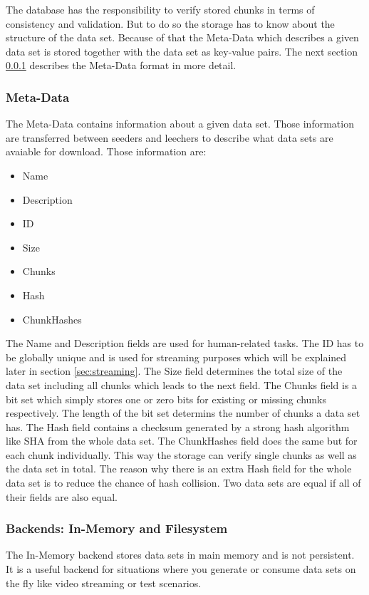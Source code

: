 The database has the responsibility to verify stored chunks in terms of consistency and validation. But to do so the storage has to know about the structure of the data set. Because of that the Meta-Data which describes a given data set is stored together with the data set as key-value pairs. The next section \ref{subsubsec:metadata} describes the Meta-Data format in more detail.

\subsubsection{Meta-Data}
\label{subsubsec:metadata}
The Meta-Data contains information about a given data set. Those information are transferred between seeders and leechers to describe what data sets are avaiable for download. Those information are:
\begin{itemize} 
\itemsep0pt
\item Name
\item Description
\item ID
\item Size
\item Chunks
\item Hash
\item ChunkHashes
\end{itemize}
The Name and Description fields are used for human-related tasks. The ID has to be globally unique and is used for streaming purposes which will be explained later in section \ref{sec:streaming}. The Size field determines the total size of the data set including all chunks which leads to the next field. The Chunks field is a bit set which simply stores one or zero bits for existing or missing chunks respectively. The length of the bit set determins the number of chunks a data set has. The Hash field contains a checksum generated by a strong hash algorithm like SHA from the whole data set. The ChunkHashes field does the same but for each chunk individually. This way the storage can verify single chunks as well as the data set in total. The reason why there is an extra Hash field for the whole data set is to reduce the chance of hash collision. Two data sets are equal if all of their fields are also equal.

\subsubsection{Backends: In-Memory and Filesystem}
The In-Memory backend stores data sets in main memory and is not persistent. It is a useful backend for situations where you generate or consume data sets on the fly like video streaming or test scenarios.

